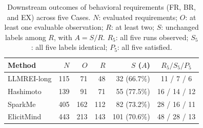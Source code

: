\begin{table}[t]
\centering
\caption{Downstream outcomes of behavioral requirements (FR, BR, and EX) across five Cases. $N$: evaluated requirements; $O$: at least one evaluable observation; $R$: at least two; $S$: unchanged labels among $R$, with $A=S/R$. $R_5$: all five runs observed; $S_5$: all five labels identical; $P_5$: all five satisfied.}
\label{tab:rq3-results}
\small
\setlength{\tabcolsep}{4pt}
\begin{tabular*}{\linewidth}{@{\extracolsep{\fill}}lrrrrc@{}}
\toprule
Method & $N$ & $O$ & $R$ & $S$ ($A$) & $R_5 / S_5 / P_5$ \\
\midrule
LLMREI-long & 115 & 71 & 48 & 32 (66.7\%) & 11 / 7 / 6 \\
Hashimoto & 139 & 91 & 71 & 55 (77.5\%) & 16 / 14 / 12 \\
SparkMe & 405 & 162 & 112 & 82 (73.2\%) & 28 / 16 / 11 \\
ElicitMind & 443 & 213 & 143 & 101 (70.6\%) & 48 / 28 / 13 \\
\bottomrule
\end{tabular*}
\end{table}
